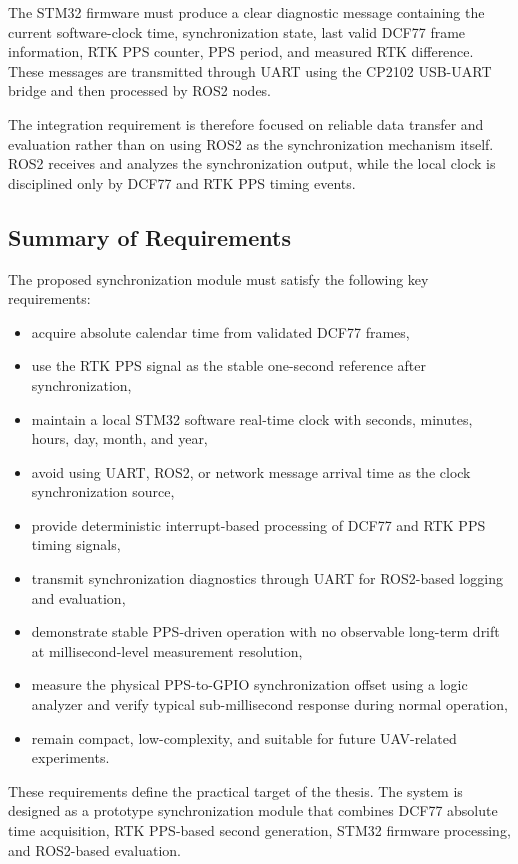 The STM32 firmware must produce a clear diagnostic message containing the current software-clock time, synchronization state, last valid DCF77 frame information, RTK PPS counter, PPS period, and measured RTK difference. These messages are transmitted through UART using the CP2102 USB-UART bridge and then processed by ROS2 nodes.

The integration requirement is therefore focused on reliable data transfer and evaluation rather than on using ROS2 as the synchronization mechanism itself. ROS2 receives and analyzes the synchronization output, while the local clock is disciplined only by DCF77 and RTK PPS timing events.

\subsection{Summary of Requirements}

The proposed synchronization module must satisfy the following key requirements:
\begin{itemize}
    \item acquire absolute calendar time from validated DCF77 frames,
    \item use the RTK PPS signal as the stable one-second reference after synchronization,
    \item maintain a local STM32 software real-time clock with seconds, minutes, hours, day, month, and year,
    \item avoid using UART, ROS2, or network message arrival time as the clock synchronization source,
    \item provide deterministic interrupt-based processing of DCF77 and RTK PPS timing signals,
    \item transmit synchronization diagnostics through UART for ROS2-based logging and evaluation,
    \item demonstrate stable PPS-driven operation with no observable long-term drift at millisecond-level measurement resolution,
    \item measure the physical PPS-to-GPIO synchronization offset using a logic analyzer and verify typical sub-millisecond response during normal operation,
    \item remain compact, low-complexity, and suitable for future UAV-related experiments.
\end{itemize}

These requirements define the practical target of the thesis. The system is designed as a prototype synchronization module that combines DCF77 absolute time acquisition, RTK PPS-based second generation, STM32 firmware processing, and ROS2-based evaluation.

